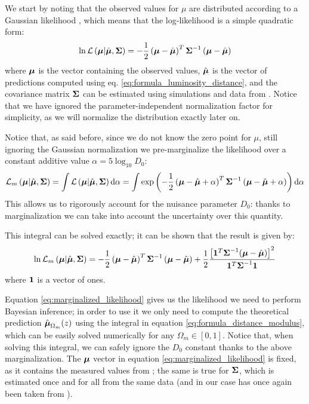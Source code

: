 We start by noting that the observed values for $\mu$ are distributed according to a Gaussian likelihood \cite{dark_energy_data} \cite{modern_cosmology}, which means that the log-likelihood is a simple quadratic form:
\begin{equation*}
    \ln\mathcal{L} \left(\vb*{\mu} | \hat{\vb*{\mu}}, \vb*{\Sigma}\right) = -\frac{1}{2}\left(\vb*{\mu}-\hat{\vb*{\mu}}\right)^T \vb*{\Sigma}^{-1}\left(\vb*{\mu}-\hat{\vb*{\mu}}\right)
\end{equation*}
where $\vb*{\mu}$ is the vector containing the observed values, $\hat{\vb*{\mu}}$ is the vector of predictions computed using eq. \eqref{eq:formula_luminosity_distance}, and the covariance matrix $\vb*{\Sigma}$ can be estimated using simulations and data from \cite{dark_energy_data}. Notice that we have ignored the parameter-independent normalization factor for simplicity, as we will normalize the distribution exactly later on.

Notice that, as said before, since we do not know the zero point for $\mu$, still ignoring the Gaussian normalization we pre-marginalize the likelihood over a constant additive value $\alpha = 5\log_{10} D_0$:
\begin{equation*}
    \mathcal{L}_m \left(\vb*{\mu} | \hat{\vb*{\mu}}, \vb*{\Sigma}\right) = \int \mathcal{L} \left(\vb*{\mu} | \hat{\vb*{\mu}}, \vb*{\Sigma}\right) \dd{\alpha} = \int \exp \left(-\frac{1}{2}\left(\vb*{\mu}-\hat{\vb*{\mu}} + \alpha\right)^T \vb*{\Sigma}^{-1}\left(\vb*{\mu}-\hat{\vb*{\mu}} + \alpha\right)\right) \dd{\alpha}
\end{equation*}
This allows us to rigorously account for the nuisance parameter $D_0$: thanks to marginalization we can take into account the uncertainty over this quantity. 

This integral can be solved exactly; it can be shown that the result is given by:
\begin{equation}
\label{eq:marginalized_likelihood}
    \ln \mathcal{L}_m\left(\vb*{\mu} | \hat{\vb*{\mu}}, \vb*{\Sigma}\right) =  -\frac{1}{2}\left(\vb*{\mu}-\hat{\vb*{\mu}}\right)^T \vb*{\Sigma}^{-1}\left(\vb*{\mu}-\hat{\vb*{\mu}}\right) + \frac{1}{2}\frac{\left[\vb{1}^T\vb*{\Sigma}^{-1}(\vb*{\mu}-\hat{\vb*{\mu}})\right]^2}{\vb{1}^T \vb*{\Sigma}^{-1} \vb{1}}
\end{equation}
where $\vb{1}$ is a vector of ones.

Equation \eqref{eq:marginalized_likelihood} gives us the likelihood we need to perform Bayesian inference; in order to use it we only need to compute the theoretical prediction $\hat{\vb*{\mu}}_{\Omega_m}(z)$ using the integral in equation \eqref{eq:formula_distance_modulus}, which can be easily solved numerically for any $\Omega_m \in [0, 1]$. Notice that, when solving this integral, we can safely ignore the $D_0$ constant thanks to the above marginalization.
The $\vb*{\mu}$ vector in equation \eqref{eq:marginalized_likelihood} is fixed, as it contains the measured values from \cite{dark_energy_data}; the same is true for $\vb*{\Sigma}$, which is estimated once and for all from the same data (and in our case has once again been taken from \cite{dark_energy_data}).

